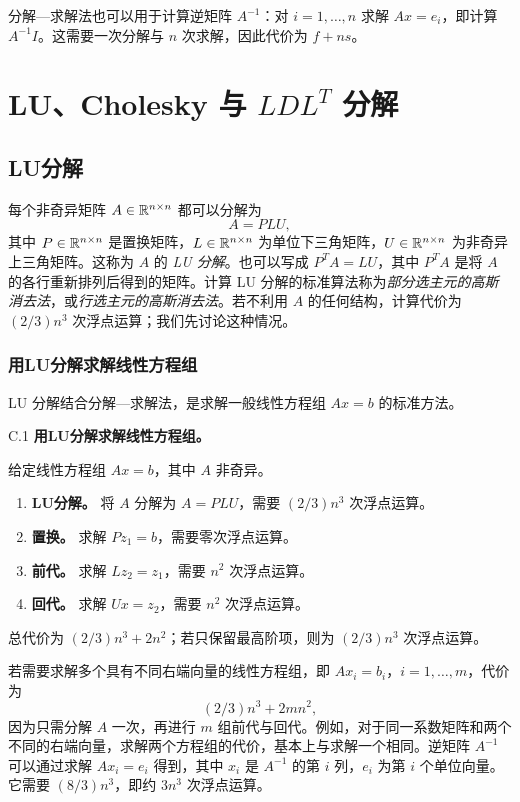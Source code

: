 分解—求解法也可以用于计算逆矩阵 $A^{-1}$：对 $i=1,\ldots,n$ 求解 $Ax=e_i$，即计算 $A^{-1}I$。这需要一次分解与 $n$ 次求解，因此代价为 $f+ns$。

\section{LU、Cholesky 与 \texorpdfstring{$LDL^T$}{LDLT} 分解}
\subsection{LU分解}
每个非奇异矩阵 $A\in\mathbb R^{n\times n}$ 都可以分解为
\[
 A=PLU,
\]
其中 $P\in\mathbb R^{n\times n}$ 是置换矩阵，$L\in\mathbb R^{n\times n}$ 为单位下三角矩阵，$U\in\mathbb R^{n\times n}$ 为非奇异上三角矩阵。这称为 $A$ 的 \emph{LU 分解}。也可以写成 $P^TA=LU$，其中 $P^TA$ 是将 $A$ 的各行重新排列后得到的矩阵。计算 LU 分解的标准算法称为\emph{部分选主元的高斯消去法}，或\emph{行选主元的高斯消去法}。若不利用 $A$ 的任何结构，计算代价为 $(2/3)n^3$ 次浮点运算；我们先讨论这种情况。

\subsubsection*{用LU分解求解线性方程组}
LU 分解结合分解—求解法，是求解一般线性方程组 $Ax=b$ 的标准方法。

\begin{origalgorithm}{C.1}
\textbf{用LU分解求解线性方程组。}

给定线性方程组 $Ax=b$，其中 $A$ 非奇异。
\begin{enumerate}
\item \textbf{LU分解。} 将 $A$ 分解为 $A=PLU$，需要 $(2/3)n^3$ 次浮点运算。
\item \textbf{置换。} 求解 $Pz_1=b$，需要零次浮点运算。
\item \textbf{前代。} 求解 $Lz_2=z_1$，需要 $n^2$ 次浮点运算。
\item \textbf{回代。} 求解 $Ux=z_2$，需要 $n^2$ 次浮点运算。
\end{enumerate}
\end{origalgorithm}

总代价为 $(2/3)n^3+2n^2$；若只保留最高阶项，则为 $(2/3)n^3$ 次浮点运算。

若需要求解多个具有不同右端向量的线性方程组，即 $Ax_i=b_i$，$i=1,\ldots,m$，代价为
\[
 (2/3)n^3+2mn^2,
\]
因为只需分解 $A$ 一次，再进行 $m$ 组前代与回代。例如，对于同一系数矩阵和两个不同的右端向量，求解两个方程组的代价，基本上与求解一个相同。逆矩阵 $A^{-1}$ 可以通过求解 $Ax_i=e_i$ 得到，其中 $x_i$ 是 $A^{-1}$ 的第 $i$ 列，$e_i$ 为第 $i$ 个单位向量。它需要 $(8/3)n^3$，即约 $3n^3$ 次浮点运算。

